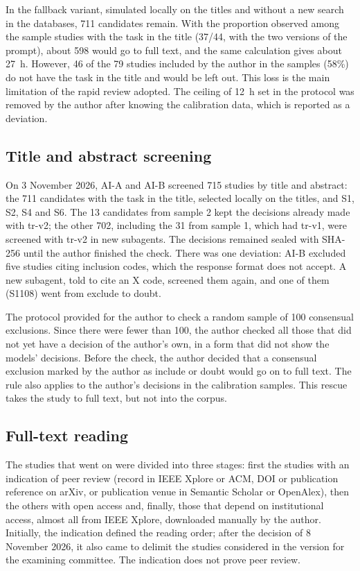 In the fallback variant, simulated locally on the titles and without a new search in the databases, 711 candidates remain. With the
proportion observed among the sample studies with the task in the title (37/44, with the two versions of the prompt),
about 598 would go to full text, and the same calculation gives about 27~h. However, 46 of the 79 studies included by the
author in the samples (58\%) do not have the task in the title and would be left out. This loss is the main limitation of the rapid review adopted. The ceiling of 12~h set in the protocol was removed by the author after knowing the
calibration data, which is reported as a deviation.

\subsection{Title and abstract screening}\label{sec:lote}
On 3 November 2026, AI-A and AI-B screened 715 studies by title and abstract: the 711 candidates with the task in the
title, selected locally on the titles, and S1, S2, S4 and S6. The 13 candidates from sample 2 kept
the decisions already made with tr-v2; the other 702, including the 31 from sample 1, which had tr-v1, were screened
with tr-v2 in new subagents. The decisions remained sealed with SHA-256 until the author finished the check. There was one
deviation: AI-B excluded five studies citing inclusion codes, which the response format does not accept. A new
subagent, told to cite an X code, screened them again, and one of them (S1108) went from exclude to doubt.

The protocol provided for the author to check a random sample of 100 consensual exclusions. Since there were fewer
than 100, the author checked all those that did not yet have a decision of the author's own, in a form that did not show the models'
decisions. Before the check, the author decided that a consensual exclusion marked by the author as include or
doubt would go on to full text. The rule also applies to the author's decisions in the calibration samples. This
rescue takes the study to full text, but not into the corpus.

\subsection{Full-text reading}\label{sec:textocompleto}
The studies that went on were divided into three stages: first the studies with an indication of peer review
(record in IEEE Xplore or ACM, DOI or publication reference on arXiv, or publication venue in Semantic
Scholar or OpenAlex), then the others with open access and, finally, those that depend on institutional access,
almost all from IEEE Xplore, downloaded manually by the author. Initially, the indication defined the reading order; after
the decision of 8 November 2026, it also came to delimit the studies considered in the version for the examining committee. The indication does not
prove peer review.


